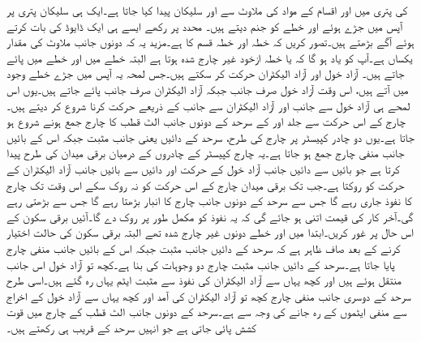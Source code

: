  کی پتری میں  اور  اقسام کے مواد کی ملاوٹ سے  اور  سلیکان پیدا کیا جاتا ہے۔ایک ہی سلیکان پتری پر آپس میں جڑے ہوئے  اور  خطے  کو جنم دیتے ہیں۔ محدد پر رکھے ایسے ہی ایک ڈایوڈ کی بات کرتے ہوئے آگے بڑھتے ہیں۔تصور کریں کہ  خطہ  اور  خطہ  قسم کا ہے۔مزید یہ کہ دونوں جانب ملاوٹ کی مقدار یکساں ہے۔آپ کو یاد ہو گا کہ  یا  خطہ ازخود غیر چارج شدہ ہوتا ہے البتہ  خطے میں  اور  خطے میں  پائے جاتے ہیں۔ آزاد خول اور آزاد الیکٹران حرکت کر سکتے ہیں۔جس لمحہ یہ آپس میں جڑے خطے وجود میں آتے ہیں، اس وقت آزاد خول صرف  جانب جبکہ آزاد الیکٹران صرف  جانب پائے جاتے ہیں۔یوں اس لمحے ہی  آزاد خول  سے  جانب اور آزاد الیکٹران  سے  جانب   کے ذریعے حرکت کرنا شروع کر دیتے ہیں۔چارج کے اس حرکت سے جلد  اور  کے سرحد کے دونوں جانب الٹ قطب کا چارج جمع ہونے شروع ہو جاتا ہے۔یوں دو چادر کپیسٹر پر چارج کی طرح، سرحد کے دائیں یعنی  جانب مثبت جبکہ اس کے بائیں جانب منفی چارج جمع ہو جاتا ہے۔یہ چارج کپیسٹر کے چادروں کے درمیان برقی میدان کی طرح  پیدا کرتا ہے جو بائیں سے دائیں جانب آزاد خول کے حرکت اور دائیں سے بائیں جانب آزاد الیکٹران کے حرکت  کو روکتا ہے۔جب تک برقی میدان  چارج کے اس حرکت کو نہ روک سکے اس وقت تک چارج کا نفوذ جاری رہے گا جس سے سرحد کے دونوں جانب چارج کا انبار بڑھتا رہے گا جس سے  بڑھتی رہے گی۔آخر کار   کی قیمت اتنی ہو جائے گی کہ یہ نفوذ کو مکمل طور پر روک دے گا۔آئیں برقی سکون کے اس حال پر غور کریں۔ابتدا میں  اور  خطے دونوں غیر چارج شدہ تھے البتہ برقی سکون کی حالت اختیار کرنے کے بعد صاف ظاہر ہے کہ سرحد کے دائیں جانب مثبت جبکہ اس کے بائیں جانب منفی چارج پایا جاتا ہے۔سرحد کے  دائیں جانب مثبت چارج دو وجوہات کی بنا ہے۔کچھ تو آزاد خول اس جانب منتقل ہوئے ہیں اور کچھ یہاں سے آزاد الیکٹران کی نفوذ سے مثبت ایٹم یہاں رہ گئے ہیں۔اسی طرح سرحد کے دوسری جانب منفی چارج کچھ تو آزاد الیکٹران کی آمد اور کچھ یہاں سے آزاد خول کے اخراج سے  منفی ایٹموں کے رہ جانے کی وجہ سے ہے۔سرحد کے دونوں جانب الٹ قطب کے چارج میں قوت کشش پائی جاتی ہے جو انہیں سرحد کے قریب ہی رکھتے ہیں۔

